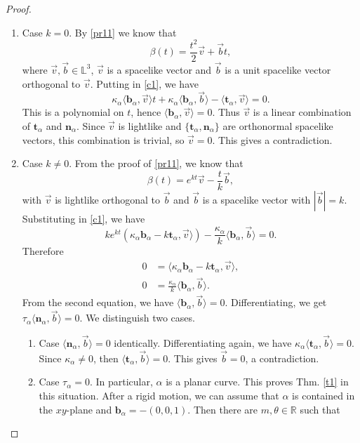 \documentclass[a4paper,12pt]{amsart}
\numberwithin{equation}{section}
\theoremstyle{definition}
\def\r{\mathbb R}
\def\r{\mathbb R}
\def\rr{\mathbb L}
\def\t{\mathbf t}
\def\n{\mathbf n}
\def\b{\mathbf b}
\begin{document}
\begin{proof}
\begin{enumerate}
\item Case $k=0$. By  \eqref{pr11} we know that 
$$\beta(t)=\frac{t^2}{2}\vec{v}+\vec{b}t,$$
where $\vec{v},\vec{b}\in\rr^3$,  $\vec{v}$ is a spacelike vector and $\vec{b}$ is a unit spacelike vector orthogonal to $\vec{v}$.   Putting in \eqref{c1}, we have 
\begin{equation}\label{c8}
\kappa_\alpha\langle\b_\alpha,\vec{v}\rangle t+\kappa_\alpha\langle\b_\alpha,\vec{b}\rangle-\langle\t_\alpha,\vec{v}\rangle=0.
\end{equation}
This is a polynomial on $t$, hence $\langle\b_\alpha,\vec{v}\rangle=0$. Thus $\vec{v}$ is a linear combination of $\t_\alpha$ and $\n_\alpha$. Since $\vec{v}$ is lightlike and $\{\t_\alpha,\n_\alpha\}$ are orthonormal spacelike vectors, this combination is trivial, so $\vec{v}=0$. This gives a contradiction.
\item Case $k\not=0$. From the proof of   \eqref{pr11}, we know that 
\begin{equation}\label{c12}
\beta(t)=e^{kt}\vec{v}-\frac{t}{k}\vec{b},
\end{equation}
with $\vec{v}$  is lightlike orthogonal to $\vec{b}$ and $\vec{b}$ is a spacelike vector with $|\vec{b}|=k$. 
Substituting in \eqref{c1},  we have 
$$k e^{kt}\left(\kappa_\alpha \b_\alpha -k \t_\alpha,\vec{v}\rangle\right)-\frac{\kappa_\alpha}{k}\langle\b_\alpha,\vec{b}\rangle=0.$$
Therefore
\begin{equation}\label{c9}
\begin{split}
0&= \langle \kappa_\alpha \b_\alpha-k\t_\alpha,\vec{v}\rangle,\\
0&=\frac{\kappa_\alpha}{k}\langle\b_\alpha,\vec{b}\rangle.
\end{split}
\end{equation}
From the second equation, we have $\langle\b_\alpha,\vec{b}\rangle=0$. Differentiating, we get  $\tau_\alpha\langle\n_\alpha,\vec{b}\rangle=0$. We distinguish two cases.
\begin{enumerate}
\item Case $\langle\n_\alpha,\vec{b}\rangle=0$ identically. Differentiating again, we have $\kappa_\alpha\langle\t_\alpha,\vec{b}\rangle=0$. Since $\kappa_\alpha\not=0$, then $\langle \t_\alpha,\vec{b}\rangle=0$. This gives $\vec{b}=0$, a contradiction. 
\item Case $\tau_\alpha=0$.   In particular, $\alpha$ is a planar curve. This proves Thm. \ref{t1} in this situation. After a rigid motion, we can assume that $\alpha$ is contained in the $xy$-plane and  $\b_\alpha=-(0,0,1)$. Then there are $m,\theta\in\r$ such that

\end{enumerate}
\end{enumerate}
\end{proof}
\end{document}
